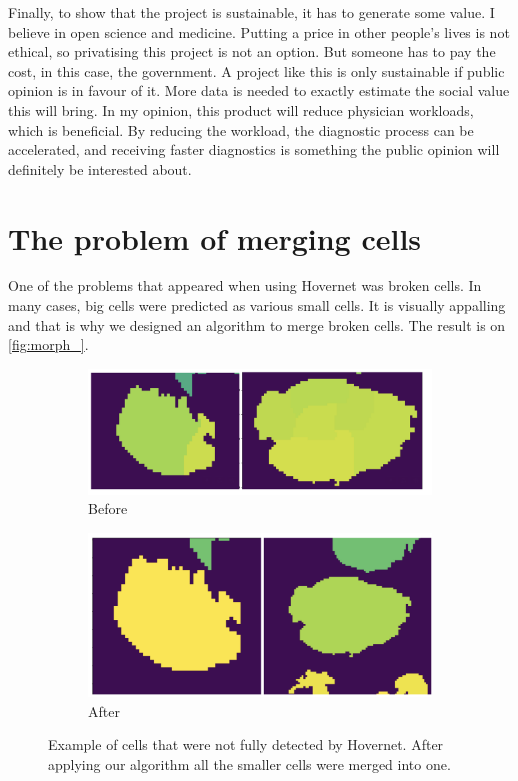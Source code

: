 Finally, to show that the project is sustainable, it has to generate some value. I believe in open science and medicine. Putting a price in other people's lives is not ethical, so privatising this project is not an option. But someone has to pay the cost, in this case, the government. A project like this is only sustainable if public opinion is in favour of it. More data is needed to exactly estimate the social value this will bring. In my opinion, this product will reduce physician workloads, which is beneficial. By reducing the workload, the diagnostic process can be accelerated, and receiving faster diagnostics is something the public opinion will definitely be interested about.

\chapter{The problem of merging cells}

One of the problems that appeared when using Hovernet was broken cells. In many cases, big cells were predicted as various small cells. It is visually appalling and that is why we designed an algorithm to merge broken cells. The result is on \autoref{fig:morph_}.

\begin{figure}[ht]
\begin{subfigure}[b]{1\textwidth}
    \centering
    \includegraphics[width=\textwidth]{imgs/morph1.png}
    \caption{Before}
    \label{fig:morph1}
\end{subfigure}
\begin{subfigure}[b]{1\textwidth}
    \centering
    \includegraphics[width=\textwidth]{imgs/morph2.png}
    \caption{After}
    \label{fig:morph2}
\end{subfigure}
\caption{Example of cells that were not fully detected by Hovernet. After applying our algorithm all the smaller cells were merged into one.}
\label{fig:morph_}
\end{figure}

